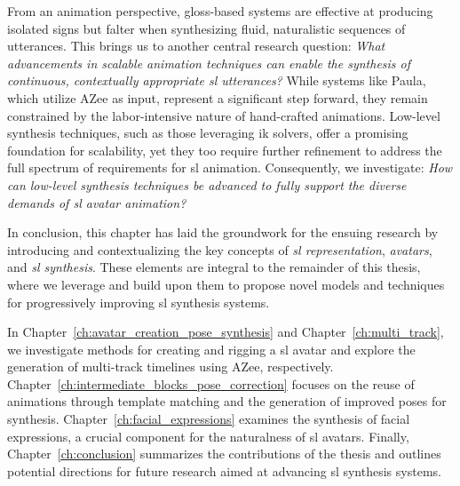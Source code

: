 \documentclass[../../main.tex]{subfiles}
\begin{document}
From an animation perspective, gloss-based systems are effective at producing isolated signs but falter when synthesizing fluid, naturalistic sequences of utterances. This brings us to another central research question: \textit{What advancements in scalable animation techniques can enable the synthesis of continuous, contextually appropriate \gls{sl} utterances?} While systems like Paula, which utilize AZee as input, represent a significant step forward, they remain constrained by the labor-intensive nature of hand-crafted animations. Low-level synthesis techniques, such as those leveraging \gls{ik} solvers, offer a promising foundation for scalability, yet they too require further refinement to address the full spectrum of requirements for \gls{sl} animation. Consequently, we investigate: \textit{How can low-level synthesis techniques be advanced to fully support the diverse demands of \gls{sl} avatar animation?}

In conclusion, this chapter has laid the groundwork for the ensuing research by introducing and contextualizing the key concepts of \textit{\gls{sl} representation}, \textit{avatars}, and \textit{\gls{sl} synthesis}. These elements are integral to the remainder of this thesis, where we leverage and build upon them to propose novel models and techniques for progressively improving \gls{sl} synthesis systems.

In Chapter~\ref{ch:avatar_creation_pose_synthesis} and Chapter~\ref{ch:multi_track}, we investigate methods for creating and rigging a \gls{sl} avatar and explore the generation of multi-track timelines using AZee, respectively. Chapter~\ref{ch:intermediate_blocks_pose_correction} focuses on the reuse of animations through template matching and the generation of improved poses for synthesis. Chapter~\ref{ch:facial_expressions} examines the synthesis of facial expressions, a crucial component for the naturalness of \gls{sl} avatars. Finally, Chapter~\ref{ch:conclusion} summarizes the contributions of the thesis and outlines potential directions for future research aimed at advancing \gls{sl} synthesis systems.
\end{document}
